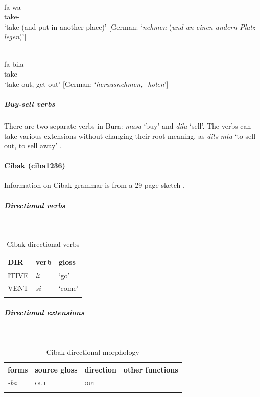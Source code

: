 \ex\label{ex2:bura19}
 \\
\gll fa-wa \\
take- \\
\glt `take (and put in another place)' [German: `\textit{nehmen} (\textit{und an einen andern Platz legen})']

\ex\label{ex2:bura20}
 \\
\gll  fa-bila \\
take- \\
\glt `take out, get out' [German: `\textit{herausnehmen, -holen}']
\z

\subparagraph{Buy-sell verbs}

There are two separate verbs in Bura: \textit{masa} `buy' and \textit{dila} `sell'. The verbs can take various extensions without changing their root meaning, as \textit{dilə-mta} `to sell out, to sell away' \citep[6]{blenchBuraVerbalExtensions2010}.

	\paragraph*{Cibak (ciba1236)} \label{ciba}

Information on Cibak grammar is from a 29-page sketch \citep{hoffmannZurSpracheCibak1955}. 

\subparagraph{Directional verbs}~

\begin{table}[H]
	\caption{Cibak directional verbs} 
	\label{tab:cibaB}
	\begin{tabular}{lll} %
		\lsptoprule
		DIR & verb & gloss   \\ %
		\midrule
		ITIVE & \textit{li} & `go' \\
		VENT & \textit{si} & `come' \\
		\lspbottomrule
	\end{tabular}
\end{table}

\subparagraph{Directional extensions}~

\begin{table}[H]
	\caption{Cibak directional morphology}
	\label{tab:ciba}
	\begin{tabular}{llll} %
		\lsptoprule
		forms & source gloss & direction  & other functions  \\ %
		\midrule
		\textit{-ba}  &  \textsc{out}  &  \textsc{out}  &   \\
		\lspbottomrule
	\end{tabular}
\end{table} 

